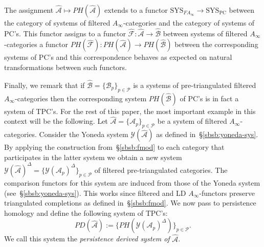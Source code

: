 
The assignment
$\widehat{\mathcal{A}} \longmapsto PH(\widehat{\mathcal{A}})$ extends
to a functor
$\text{SYS}_{F A_{\infty}} \longrightarrow \text{SYS}_{\text{PC}}$
between the category of systems of filtered $A_{\infty}$-categories
and the category of systems of PC's. This functor assigns to a functor
$\widehat{\mathcal{F}} : \widehat{\mathcal{A}} \longrightarrow \widehat{\mathcal{B}}$
between systems of filtered $A_{\infty}$-categories a functor
$PH(\widehat{\mathcal{F}}): PH(\widehat{\mathcal{A}}) \longrightarrow
PH(\widehat{\mathcal{B}})$ between the corresponding systems of PC's and this
correspondence behaves as expected on natural transformations between
such functors.

Finally, we remark that if
$\widehat{\mathcal{B}} = \{\mathcal{B}_p\}_{p \in \mathcal{P}}$ is a systems of
pre-triangulated filtered $A_{\infty}$-categories then the
corresponding system $PH(\widehat{\mathcal{B}})$ of PC's is in fact a
system of TPC's. For the rest of this paper, the most important
example in this context will be the following. Let
$\widehat{\mathcal{A}} = \{\mathcal{A}_p\}_{p \in \mathcal{P}}$ be a
system of filtered $A_{\infty}$-categories. Consider the Yoneda system
$\mathcal{Y}(\widehat{\mathcal{A}})$ as defined
in~\S\ref{sbsb:yoneda-sys}. By applying the construction
from~\S\ref{sbsb:fmod} to each category that participates in the
latter system we obtain a new system
$\mathcal{Y}(\mathcal{\widehat{A}})^{\Delta} =
\{\mathcal{Y}(\mathcal{A}_p)^{\Delta} \}_{p \in \mathcal{P}}$ of
filtered pre-triangulated categories. The comparison functors for this
system are induced from those of the Yoneda system
(see~\S\ref{sbsb:yoneda-sys}). This works since filtered and LD
$A_{\infty}$-functors preserve triangulated completions as defined
in~\S\ref{sbsb:fmod}. We now pass to persistence homology and define
the following system of TPC's:
\begin{equation} \label{eq:PDA-sys} PD(\widehat{\mathcal{A}}) :=
  \{PH(\mathcal{Y}(\mathcal{A}_p)^{\Delta})\}_{p \in \mathcal{P}}.
\end{equation}
We call this system the {\em persistence derived system of}
$\widehat{\mathcal{A}}$.


